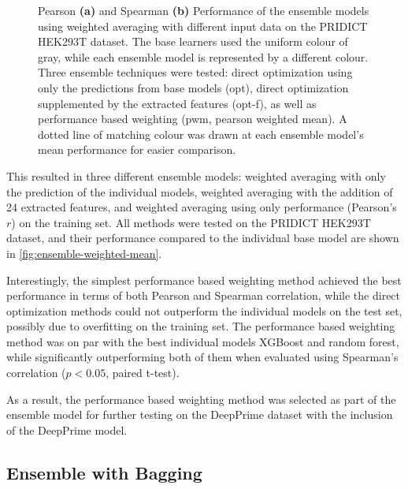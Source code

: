 \begin{figure}
    \caption[Ensemble Model Performance]{Pearson \textbf{(a)} and Spearman \textbf{(b)} Performance of the ensemble models using weighted averaging with different input data on the PRIDICT HEK293T dataset. The base learners used the uniform colour of gray, while each ensemble model is represented by a different colour. Three ensemble techniques were tested: direct optimization using only the predictions from base models (opt), direct optimization supplemented by the extracted features (opt-f), as well as performance based weighting (pwm, pearson weighted mean). A dotted line of matching colour was drawn at each ensemble model's mean performance for easier comparison.}
    \label{fig:ensemble-weighted-mean}
\end{figure}

This resulted in three different ensemble models: weighted averaging with only the prediction of the individual models, weighted averaging with the addition of 24 extracted features, and weighted averaging using only performance (Pearson's $r$) on the training set. All methods were tested on the PRIDICT HEK293T dataset, and their performance compared to the individual base model are shown in \autoref{fig:ensemble-weighted-mean}.

Interestingly, the simplest performance based weighting method achieved the best performance in terms of both Pearson and Spearman correlation, while the direct optimization methods could not outperform the individual models on the test set, possibly due to overfitting on the training set. The performance based weighting method was on par with the best individual models XGBoost and random forest, while significantly outperforming both of them when evaluated using Spearman's correlation ($p<0.05$, paired t-test). 

As a result, the performance based weighting method was selected as part of the ensemble model for further testing on the DeepPrime dataset with the inclusion of the DeepPrime model.

\subsection{Ensemble with Bagging}

